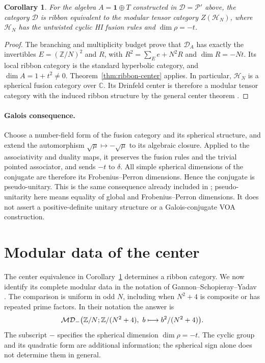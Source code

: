 \documentclass[11pt,a4paper]{article}
\numberwithin{equation}{section}
\newtheorem{corollary}[theorem]{Corollary}
\theoremstyle{definition}\newtheorem{definition}[theorem]{Definition}
\theoremstyle{remark}\newtheorem{remark}[theorem]{Remark}
\newcommand{\Par}{\mathcal P}\newcommand{\Neu}{\mathcal D}
\begin{document}
\begin{corollary}\label{cor:our-center}
For the algebra $A=\mathbf1\oplus T$ constructed in $\mathcal D=\Par'$
above, the category $\mathcal D$ is ribbon equivalent to the modular
tensor category $Z(\mathcal H_N)$, where $\mathcal H_N$ has the untwisted cyclic HI
fusion rules and $\dim\rho=-t$.
\end{corollary}
\begin{proof}
The branching and multiplicity budget prove that
$\mathcal D_A$ has exactly the invertibles $E=(\mathbb Z/N)^2$ and
$R$, with $R^2=\sum_E e+N^2R$ and $\dim R=-Nt$.
Its local ribbon category is the standard hyperbolic category,
and $\dim A=1+t^2\ne0$. Theorem~\ref{thm:ribbon-center} applies.
In particular, $\mathcal H_N$ is a spherical fusion category over
$\mathbb C$. Its Drinfeld center is therefore a modular tensor category
with the induced ribbon structure by the general center theorem
\cite[Section 2.9]{dgno}.
\end{proof}


\paragraph{Galois consequence.}
Choose a number-field form of the fusion category and its spherical
structure, and extend the automorphism
$\sqrt\mu\mapsto-\sqrt\mu$ to its algebraic closure. Applied to the
associativity and duality maps, it preserves the fusion rules and
the trivial pointed associator, and sends $-t$ to $\delta$.
All simple spherical dimensions of the conjugate are therefore
its Frobenius--Perron dimensions. Hence the conjugate is
pseudo-unitary. This is the same consequence already included in
\cite[Theorem A(1) and Section 1.3]{gsy}; pseudo-unitarity here means
equality of global and Frobenius--Perron dimensions. It does not
assert a positive-definite unitary structure or a Galois-conjugate
VOA construction.

\section{Modular data of the center}
\label{sec:gsy-modular}

The center equivalence in Corollary~\ref{cor:our-center} determines
a ribbon category. We now identify its complete modular data in the
notation of Gannon--Schopieray--Yadav \cite[Section 5 and Appendix F.1]{gsy}.
The comparison is uniform in odd $N$, including when $N^2+4$ is
composite or has repeated prime factors. In their notation the answer is
\[
 \mathcal{MD}_{-}\bigl(\Z/N;\Z/(N^2+4),\ b\longmapsto b^2/(N^2+4)\bigr).
\]
The subscript $-$ specifies the spherical dimension $\dim\rho=-t$.
The cyclic group and its quadratic form are additional information;
the spherical sign alone does not determine them in general.
\end{document}
